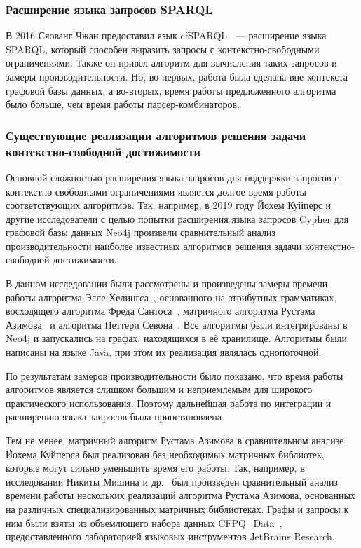 \documentclass[14pt]{matmex-diploma-custom}
\newcommand{\gsv}[1]{\textcolor{red}{#1$^{\text{gsv}}$}}
\begin{document}
\subsubsection{Расширение языка запросов SPARQL}\label{subsection:cypher-extention-2}
В 2016 Сяованг Чжан предоставил язык cfSPARQL~\cite{zhlang-2016} --- расширение языка SPARQL, который способен выразить запросы с контекстно-свободными ограничениями. Также он привёл алгоритм для вычисления таких запросов и замеры производительности. Но, во-первых, работа была сделана вне контекста графовой базы данных, а во-вторых, время работы предложенного алгоритма было больше, чем время работы парсер-комбинаторов.

\subsubsection{Существующие реализации алгоритмов решения задачи контекстно-свободной достижимости}
Основной сложностью расширения языка запросов для поддержки запросов с контекстно-свободными ограничениями является долгое время работы соответствующих алгоритмов. Так, например, в 2019 году Йохем Куйперс и другие исследователи с целью попытки расширения языка запросов Cypher для графовой базы данных Neo4j произвели сравнительный анализ производительности наиболее известных алгоритмов решения задачи контекстно-свободной достижимости.

В данном исследовании были рассмотрены и произведены замеры времени работы алгоритма Элле Хелингса~\cite{hellings-2015}, основанного на атрибутных грамматиках, восходящего алгоритма Фреда Сантоса~\cite{santos-2018}, матричного алгоритма Рустама Азимова~\cite{Azimov:2018:CPQ:3210259.3210264} и алгоритма Петтери Севона~\cite{bio-application}. Все алгоритмы были интегрированы в Neo4j и запускались на графах, находящихся в её хранилище. Алгоритмы были написаны на языке Java, при этом их реализация являлась однопоточной.


По результатам замеров производительности было показано, что время работы алгоритмов является слишком большим и неприемлемым для широкого практического использования. Поэтому дальнейшая работа по интеграции и расширению языка запросов была приостановлена.

Тем не менее, матричный алгоритм Рустама Азимова в сравнительном анализе Йохема Куйперса был реализован без необходимых матричных библиотек, которые могут сильно уменьшить время его работы. Так, например, в исследовании Никиты Мишина и др.~\cite{azimov-evalution} был произведён сравнительный анализ времени работы нескольких реализаций алгоритма Рустама Азимова, основанных на различных специализированных матричных библиотеках. Графы и запросы к ним были взяты из объемлющего набора данных CFPQ\_Data~\cite{cfpq-data}, предоставленного лабораторией языковых инструментов JetBrains Research. 
\end{document}
